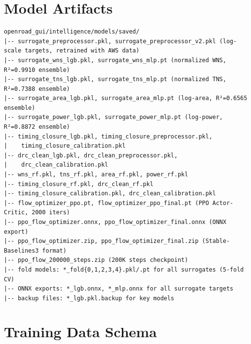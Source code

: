 \documentclass[10pt,conference]{IEEEtran}
\begin{document}
\begin{table}[t]




\appendix

\section{Model Artifacts}
\label{app:artifacts}


\begin{Verbatim}[breaklines=true,breakanywhere=true]
openroad_gui/intelligence/models/saved/
|-- surrogate_preprocessor.pkl, surrogate_preprocessor_v2.pkl (log-scale targets, retrained with AWS data)
|-- surrogate_wns_lgb.pkl, surrogate_wns_mlp.pt (normalized WNS, R²=0.9910 ensemble)
|-- surrogate_tns_lgb.pkl, surrogate_tns_mlp.pt (normalized TNS, R²=0.7388 ensemble)
|-- surrogate_area_lgb.pkl, surrogate_area_mlp.pt (log-area, R²=0.6565 ensemble)
|-- surrogate_power_lgb.pkl, surrogate_power_mlp.pt (log-power, R²=0.8872 ensemble)
|-- timing_closure_lgb.pkl, timing_closure_preprocessor.pkl,
|    timing_closure_calibration.pkl
|-- drc_clean_lgb.pkl, drc_clean_preprocessor.pkl,
|    drc_clean_calibration.pkl
|-- wns_rf.pkl, tns_rf.pkl, area_rf.pkl, power_rf.pkl
|-- timing_closure_rf.pkl, drc_clean_rf.pkl
|-- timing_closure_calibration.pkl, drc_clean_calibration.pkl
|-- flow_optimizer_ppo.pt, flow_optimizer_ppo_final.pt (PPO Actor-Critic, 2000 iters)
|-- ppo_flow_optimizer.onnx, ppo_flow_optimizer_final.onnx (ONNX export)
|-- ppo_flow_optimizer.zip, ppo_flow_optimizer_final.zip (Stable-Baselines3 format)
|-- ppo_flow_200000_steps.zip (200K steps checkpoint)
|-- fold models: *_fold{0,1,2,3,4}.pkl/.pt for all surrogates (5-fold CV)
|-- ONNX exports: *_lgb.onnx, *_mlp.onnx for all surrogate targets
|-- backup files: *_lgb.pkl.backup for key models
\end{Verbatim}

\section{Training Data Schema}
\label{app:data_schema}


\end{table}
\end{document}
